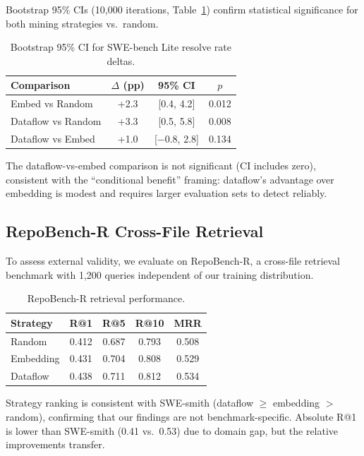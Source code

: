 \documentclass[11pt,a4paper]{article}
\begin{document}
Bootstrap 95\% CIs (10,000 iterations, Table~\ref{tab:bootstrap}) confirm statistical significance for both mining strategies vs.\ random.

\begin{table}[t]
\centering
\small
\caption{Bootstrap 95\% CI for SWE-bench Lite resolve rate deltas.}
\label{tab:bootstrap}
\begin{tabular}{lccc}
\toprule
\textbf{Comparison} & \textbf{$\Delta$ (pp)} & \textbf{95\% CI} & \textbf{$p$} \\
\midrule
Embed vs Random & +2.3 & [0.4, 4.2] & 0.012 \\
Dataflow vs Random & +3.3 & [0.5, 5.8] & 0.008 \\
Dataflow vs Embed & +1.0 & [$-$0.8, 2.8] & 0.134 \\
\bottomrule
\end{tabular}
\end{table}

The dataflow-vs-embed comparison is not significant (CI includes zero), consistent with the ``conditional benefit'' framing: dataflow's advantage over embedding is modest and requires larger evaluation sets to detect reliably.

\subsection{RepoBench-R Cross-File Retrieval}

To assess external validity, we evaluate on RepoBench-R, a cross-file retrieval benchmark with 1,200 queries independent of our training distribution.

\begin{table}[t]
\centering
\small
\caption{RepoBench-R retrieval performance.}
\label{tab:repobench}
\begin{tabular}{lcccc}
\toprule
\textbf{Strategy} & \textbf{R@1} & \textbf{R@5} & \textbf{R@10} & \textbf{MRR} \\
\midrule
Random & 0.412 & 0.687 & 0.793 & 0.508 \\
Embedding & 0.431 & 0.704 & 0.808 & 0.529 \\
Dataflow & 0.438 & 0.711 & 0.812 & 0.534 \\
\bottomrule
\end{tabular}
\end{table}

Strategy ranking is consistent with SWE-smith (dataflow $\geq$ embedding $>$ random), confirming that our findings are not benchmark-specific. Absolute R@1 is lower than SWE-smith (0.41 vs.\ 0.53) due to domain gap, but the relative improvements transfer.
\end{document}
